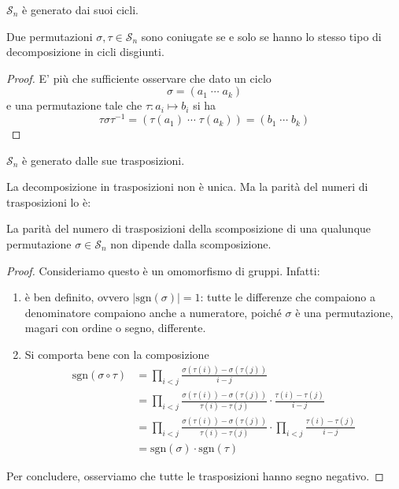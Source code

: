 \begin{multicols}{2}
\begin{remark}
	$ \mathcal{S}_n $ è generato dai suoi cicli.
\end{remark}
\begin{prop}
	Due permutazioni $ \sigma, \tau \in \mathcal{S}_n $ sono coniugate se e solo se hanno lo stesso tipo di decomposizione in cicli disgiunti.
\end{prop}
\begin{proof}
	E' più che sufficiente osservare che dato un ciclo $$  \sigma = (a_1 \; \cdots \; a_k)  $$ e una permutazione tale che $ \tau : a_i \mapsto b_i $ si ha
	\[\tau\sigma\tau^{-1} = (\tau(a_1) \; \cdots \; \tau(a_k)) = (b_1 \; \cdots \; b_k) \]
\end{proof}
\begin{remark}
	$ \mathcal{S}_n $ è generato dalle sue trasposizioni.
\end{remark}
\begin{remark}
	La decomposizione in trasposizioni non è unica. Ma la parità del numeri di trasposizioni lo è:
\end{remark}
\begin{theorem}
	La parità del numero di trasposizioni della scomposizione di una qualunque permutazione $ \sigma \in \mathcal{S}_n $ non dipende dalla scomposizione.
\end{theorem}
\begin{proof}
	Consideriamo
	questo è un omomorfismo di gruppi. Infatti:
	\begin{enumerate}
		\item è ben definito, ovvero $ |\text{sgn}(\sigma)| = 1 $: tutte le differenze che compaiono a denominatore compaiono anche a numeratore, poiché $ \sigma $ è una permutazione, magari con ordine o segno, differente.
		\item Si comporta bene con la composizione
		\begin{align*}
			\text{sgn}(\sigma \circ \tau) &= \prod_{i < j}\frac{\sigma(\tau(i))-\sigma(\tau(j))}{i-j} \\
			& = \prod_{i < j}\frac{\sigma(\tau(i))-\sigma(\tau(j))}{\tau(i)-\tau(j)}\cdot \frac{\tau(i)-\tau(j)}{i-j} \\
			& = \prod_{i < j}\frac{\sigma(\tau(i))-\sigma(\tau(j))}{\tau(i)-\tau(j)}\cdot\prod_{i < j} \frac{\tau(i)-\tau(j)}{i-j}\\
			& = \text{sgn}(\sigma)\cdot \text{sgn}(\tau)
		\end{align*}
	\end{enumerate}
	Per concludere, osserviamo che tutte le trasposizioni hanno segno negativo. 
\end{proof}


\end{multicols}
